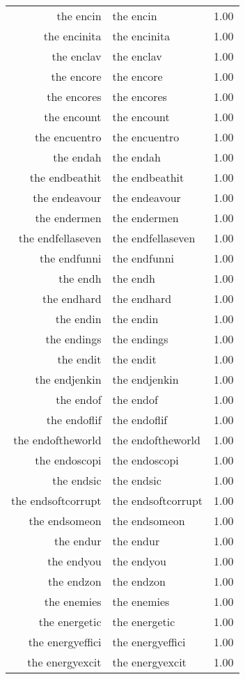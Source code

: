 \begin{table}[ht]
\begin{tabular}{rlr}
  the encin & the encin & 1.00 \\ 
  the encinita & the encinita & 1.00 \\ 
  the enclav & the enclav & 1.00 \\ 
  the encore & the encore & 1.00 \\ 
  the encores & the encores & 1.00 \\ 
  the encount & the encount & 1.00 \\ 
  the encuentro & the encuentro & 1.00 \\ 
  the endah & the endah & 1.00 \\ 
  the endbeathit & the endbeathit & 1.00 \\ 
  the endeavour & the endeavour & 1.00 \\ 
  the endermen & the endermen & 1.00 \\ 
  the endfellaseven & the endfellaseven & 1.00 \\ 
  the endfunni & the endfunni & 1.00 \\ 
  the endh & the endh & 1.00 \\ 
  the endhard & the endhard & 1.00 \\ 
  the endin & the endin & 1.00 \\ 
  the endings & the endings & 1.00 \\ 
  the endit & the endit & 1.00 \\ 
  the endjenkin & the endjenkin & 1.00 \\ 
  the endof & the endof & 1.00 \\ 
  the endoflif & the endoflif & 1.00 \\ 
  the endoftheworld & the endoftheworld & 1.00 \\ 
  the endoscopi & the endoscopi & 1.00 \\ 
  the endsic & the endsic & 1.00 \\ 
  the endsoftcorrupt & the endsoftcorrupt & 1.00 \\ 
  the endsomeon & the endsomeon & 1.00 \\ 
  the endur & the endur & 1.00 \\ 
  the endyou & the endyou & 1.00 \\ 
  the endzon & the endzon & 1.00 \\ 
  the enemies & the enemies & 1.00 \\ 
  the energetic & the energetic & 1.00 \\ 
  the energyeffici & the energyeffici & 1.00 \\ 
  the energyexcit & the energyexcit & 1.00 \\ 

\end{tabular}
\end{table}
